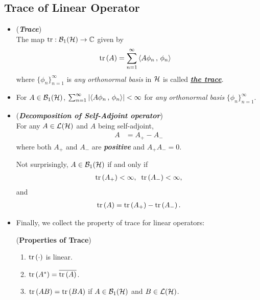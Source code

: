 \documentclass[11pt]{article}
\begin{document}
\subsection{Trace of Linear Operator}
\begin{itemize}
\item \begin{definition} (\textbf{\emph{Trace}})\\
The map $\text{tr}: {\mathcal B}_1({\mathcal H}) \rightarrow {\mathbb C}$ given by
\begin{align*}
\mathrm{tr}\left(A \right) &= \sum_{n=1}^{\infty}\left\langle A\phi_n\,,\, \phi_n \right\rangle
\end{align*}
where $\{\phi_n\}_{n=1}^{\infty}$ is \emph{any} \emph{orthonormal basis} in ${\mathcal H}$ is called \underline{\emph{\textbf{the trace}}}. 
\end{definition}

\item \begin{remark}
For $A \in {\mathcal B}_1({\mathcal H})$, $\sum_{n=1}^{\infty}\left\lvert \left\langle A\phi_n\,,\, \phi_n \right\rangle \right\rvert < \infty$ for \emph{any\textbf{}} \emph{orthonormal basis} $\{\phi_n\}_{n=1}^{\infty}$.
\end{remark}

\item \begin{remark} (\emph{\textbf{Decomposition of Self-Adjoint operator}})\\
For any $A \in {\mathcal L}({\mathcal H})$ and $A$ being self-adjoint, 
\begin{align*}
A &= A_{+} - A_{-}
\end{align*} where both $A_+$ and $A_{-}$ are \emph{\textbf{positive}} and $A_{+}A_{-} = 0$. 

Not surprisingly, $A \in {\mathcal B}_1({\mathcal H})$  if  and only if 
\begin{align*}
\mathrm{tr}\left(A_{+} \right) < \infty, \;\; \mathrm{tr}\left(A_{-} \right) < \infty,
\end{align*} and
\begin{align*}
\mathrm{tr}\left(A \right) = \mathrm{tr}\left(A_{+} \right) -  \mathrm{tr}\left(A_{-} \right).
\end{align*}
\end{remark}

\item Finally, we collect the property of trace for linear operators:
\begin{proposition} (\textbf{Properties of Trace}) \citep{reed1980methods}
\begin{enumerate}
\item $\mathrm{tr}\left(\cdot \right)$  is linear. 
\item $\mathrm{tr}\left(A^{*} \right) = \overline{\mathrm{tr}\left(A \right)}$. 
\item$\mathrm{tr}\left(AB \right) = \mathrm{tr}\left(BA \right)$ if $A \in {\mathcal B}_1({\mathcal H})$ and $B \in {\mathcal L}({\mathcal H})$. 
\end{enumerate}
\end{proposition}


\end{itemize}
\end{document}
